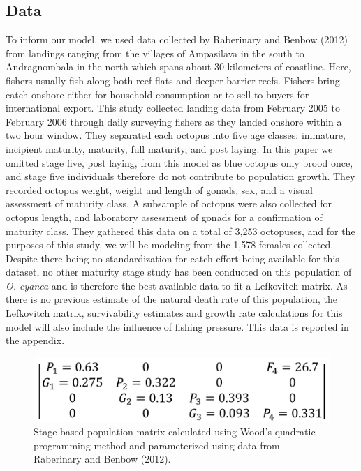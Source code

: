 \documentclass[
]{article}
\begin{document}
\hypertarget{data}{%
\subsection{Data}\label{data}}

To inform our model, we used data collected by Raberinary and Benbow (2012) from landings ranging from the villages of Ampasilava in the south to Andragnombala in the north which spans about 30 kilometers of coastline. Here, fishers usually fish along both reef flats and deeper barrier reefs. Fishers bring catch onshore either for household consumption or to sell to buyers for international export. This study collected landing data from February 2005 to February 2006 through daily surveying fishers as they landed onshore within a two hour window. They separated each octopus into five age classes: immature, incipient maturity, maturity, full maturity, and post laying. In this paper we omitted stage five, post laying, from this model as blue octopus only brood once, and stage five individuals therefore do not contribute to population growth. They recorded octopus weight, weight and length of gonads, sex, and a visual assessment of maturity class. A subsample of octopus were also collected for octopus length, and laboratory assessment of gonads for a confirmation of maturity class. They gathered this data on a total of 3,253 octopuses, and for the purposes of this study, we will be modeling from the 1,578 females collected. Despite there being no standardization for catch effort being available for this dataset, no other maturity stage study has been conducted on this population of \emph{O. cyanea} and is therefore the best available data to fit a Lefkovitch matrix. As there is no previous estimate of the natural death rate of this population, the Lefkovitch matrix, survivability estimates and growth rate calculations for this model will also include the influence of fishing pressure. This data is reported in the appendix.

\begin{figure}
\includegraphics[width=1\linewidth]{MtxFilled} \caption{Stage-based population matrix calculated using Wood's quadratic programming method and parameterized using data from Raberinary and Benbow (2012). \label{WriteMtxRounded}}\label{fig:WriteMtxRounded}
\end{figure}
\end{document}
